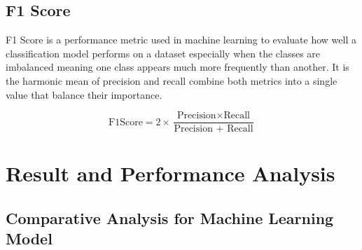 \subsection{F1 Score}
F1 Score is a performance metric used in machine learning to evaluate how well a classification model performs on a dataset especially when the classes are imbalanced meaning one class appears much more frequently than another. It is the harmonic mean of precision and recall combine both metrics into a single value that balance their importance. 

\begin{equation}
    \text{F1Score} = 2 \times \frac{\text{Precision} \times \text{Recall}}{\text{Precision + Recall}}
\end{equation}


\section{Result and Performance Analysis}

\subsection{Comparative Analysis for Machine Learning Model}


